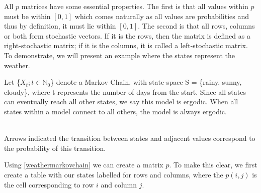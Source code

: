 All $p$ matrices have some essential properties. The first is that all values within $p$ must be within $[0,1]$ which comes naturally as all values are probabilities and thus by definition, it must lie within $[0,1]$. The second is that all rows, columns or both form stochastic vectors. If it is the rows, then the matrix is defined as a right-stochastic matrix; if it is the columns, it is called a left-stochastic matrix.\\

To demonstrate, we will present an example where the states represent the weather.  

\begin{example}
\label{weathermarkovchain}
    Let \{$X_t; t \in \mathbb{N}_0$\} denote a Markov Chain, with state-space S = \{rainy, sunny, cloudy\}, where t represents the number of days from the start. Since all states can eventually reach all other states, we say this model is ergodic. When all states within a model connect to all others, the model is always ergodic.
    
    \begin{center}
    \\

    Arrows indicated the transition between states and adjacent values correspond to the probability of this transition. 
    \end{center}
\end{example}

Using \ref{weathermarkovchain} we can create a matrix $p$. To make this clear, we first create a table with our states labelled for rows and columns, where the $p(i,j)$ is the cell corresponding to row $i$ and column $j$.

